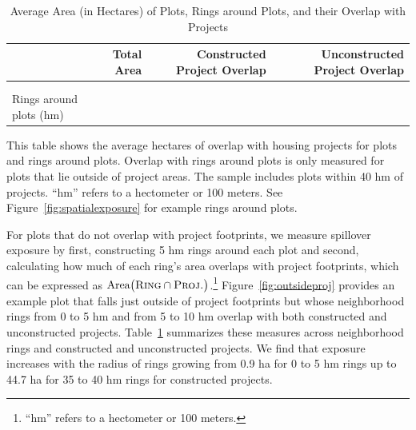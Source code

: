 \documentclass[12pt]{article}
\newcommand{\hmref}{
	``hm'' refers to a hectometer or 100 meters.
}
\begin{document}
\begin{table}
\small
\centering
\caption{Average Area (in Hectares) of Plots, Rings around Plots, and their Overlap with Projects}\label{table:spatialsummary}
\vspace{-2mm}
\begin{threeparttable}
\begin{tabular}{lrrr}
\toprule
& \multicolumn{1}{G}{Total Area} & \multicolumn{1}{G}{Constructed Project Overlap} &\multicolumn{1}{G}{Unconstructed Project Overlap} \\
\midrule
\\[-.7em]

\\[-.5em]
\hspace{2em}Rings around plots (hm)   \\

\bottomrule
\end{tabular}
\begin{tablenotes}
\item \footnotesize  This table shows the average hectares of overlap with housing projects for plots and rings around plots.  Overlap with rings around plots is only measured for plots that lie outside of project areas.  The sample includes plots within 40 hm of projects. \hmref  See Figure~\ref{fig:spatialexposure} for example rings around plots.
\end{tablenotes}
\end{threeparttable}
\end{table}

For plots that do not overlap with project footprints, we measure spillover exposure by first, constructing 5 hm rings around each plot and second, calculating how much of each ring's area overlaps with project footprints, which can be expressed as $\text{Area}\big(\textsc{Ring}  \cap  \textsc{Proj.}\big)$.\footnote{\hmref}  Figure~\ref{fig:outsideproj} provides an example plot that falls just outside of project footprints but whose neighborhood rings from 0 to 5 hm and from 5 to 10 hm overlap with both constructed and unconstructed projects.  Table~\ref{table:spatialsummary} summarizes these measures across neighborhood rings and constructed and unconstructed projects.  We find that exposure increases with the radius of rings growing from 0.9 ha for 0 to 5 hm rings up to 44.7 ha for 35 to 40 hm rings for constructed projects.  
\end{document}
